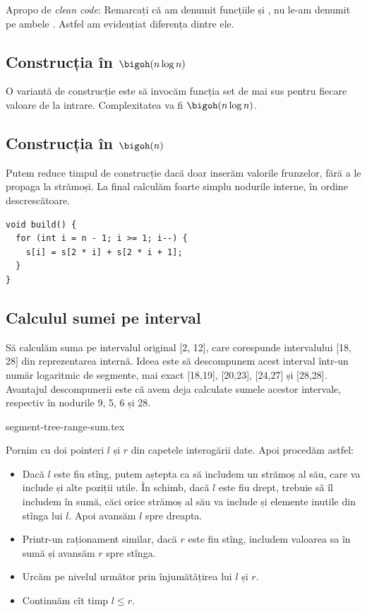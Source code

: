 Apropo de \textit{clean code}: Remarcați că am denumit funcțiile  și , nu le-am denumit pe ambele . Astfel am evidențiat diferența dintre ele.

\subsection{Construcția în \texorpdfstring{$\bigoh(n \log n)$}{O(n log n)}}

O variantă de construcție este să invocăm funcția set de mai sus pentru fiecare valoare de la intrare. Complexitatea va fi $\bigoh(n \log n)$.

\subsection{Construcția în \texorpdfstring{$\bigoh(n)$}{O(n)}}

Putem reduce timpul de construcție dacă doar inserăm valorile frunzelor, fără a le propaga la strămoși. La final calculăm foarte simplu nodurile interne, în ordine descrescătoare.

\begin{verbatim}
void build() {
  for (int i = n - 1; i >= 1; i--) {
    s[i] = s[2 * i] + s[2 * i + 1];
  }
}
\end{verbatim}

\subsection{Calculul sumei pe interval}

Să calculăm suma pe intervalul original [2, 12], care corespunde intervalului [18, 28] din reprezentarea internă. Ideea este să descompunem acest interval într-un număr logaritmic de segmente, mai exact [18,19], [20,23], [24,27] și [28,28]. Avantajul descompunerii este că avem deja calculate sumele acestor intervale, respectiv în nodurile 9, 5, 6 și 28.

{segment-tree-range-sum.tex}

Pornim cu doi pointeri $l$ și $r$ din capetele interogării date. Apoi procedăm astfel:

\begin{itemize}
  \item Dacă $l$ este fiu stîng, putem aștepta ca să includem un strămoș al său, care va include și alte poziții utile. În schimb, dacă $l$ este fiu drept, trebuie să îl includem în sumă, căci orice strămoș al său va include și elemente inutile din stînga lui $l$. Apoi avansăm $l$ spre dreapta.

  \item Printr-un raționament similar, dacă $r$ este fiu stîng, includem valoarea sa în sumă și avansăm $r$ spre stînga.

  \item Urcăm pe nivelul următor prin înjumătățirea lui $l$ și $r$.

  \item Continuăm cît timp $l \leq r$.
\end{itemize}

